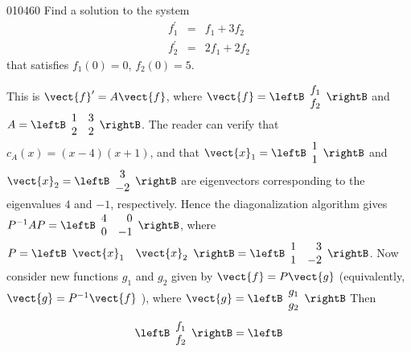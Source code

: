 \begin{example}{}{010460}
Find a solution to the system
\begin{equation*}
\begin{array}{ccr}
f_1^{\prime} &= &f_1 + 3f_2 \\
f_2^{\prime} &= &2f_1 + 2f_2
\end{array}
\end{equation*}
that satisfies $f_{1}(0) = 0$, $f_{2}(0) = 5$.


\begin{solution}
  This is $\vect{f}^{\prime} = A\vect{f}$, where $\vect{f} = \leftB \begin{array}{c}
f_1\\
f_2\end{array}\rightB$
 and $A = \leftB \begin{array}{rr}
1 & 3 \\
2 & 2 
\end{array}\rightB$. The reader can verify that $c_{A}(x) = (x - 4)(x + 1)$, and that $\vect{x}_1 = \leftB \begin{array}{c}
1\\
1\end{array}\rightB$
 and $\vect{x}_2 = \leftB \begin{array}{c}
3\\
-2\end{array}\rightB$
 are eigenvectors corresponding to the eigenvalues $4$ and $-1$, respectively. Hence the diagonalization algorithm gives $P^{-1}AP = \leftB \begin{array}{rr}
4 & 0 \\
0 & -1 
\end{array}\rightB$, where $P = \leftB \begin{array}{cc}
\vect{x}_1 & \vect{x}_2 
\end{array}\rightB = \leftB \begin{array}{rr}
1 & 3 \\
1 & -2
\end{array}\rightB$.
 Now consider new functions $g_{1}$ and $g_{2}$ given by $\vect{f} = P\vect{g}$ (equivalently, $\vect{g} = P^{-1} \vect{f}$
), where $\vect{g} = \leftB \begin{array}{c}
g_1\\
g_2\end{array}\rightB$
 Then
\begin{equation*}
\leftB \begin{array}{c}
f_1\\
f_2\end{array}\rightB = \leftB \begin{array}{rr}

\end{array}
\end{equation*}
\end{solution}
\end{example}
